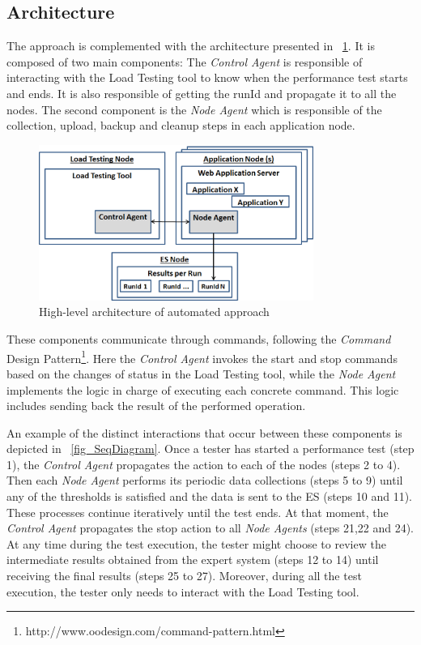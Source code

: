 \documentclass[runningheads,a4paper]{llncs}
\begin{document}
\vspace{-5pt}
\subsection{Architecture}
\vspace{-5pt}
The approach is complemented with the architecture
presented in \figurename ~\ref{fig_Arch}. It is composed of two main components:
The \emph{Control Agent} is responsible of interacting with the Load
Testing tool to know when the performance test starts and ends. It is also
responsible of getting the runId and propagate it to all the nodes. The second
component is the \emph{Node Agent} which is responsible of the collection,
upload, backup and cleanup steps in each application node. 

\begin{figure}[!h]
\centering
\includegraphics[totalheight=.22\textheight,width=0.8\textwidth]{architecture_dwait}
\caption{High-level architecture of automated approach}
\label{fig_Arch}
\end{figure}

These components communicate through commands, following the \emph{Command}
Design Pattern\footnote{http://www.oodesign.com/command-pattern.html}. Here the
\emph{Control Agent} invokes the start and stop commands based on the
changes of status in the Load Testing tool, while the \emph{Node Agent}
implements the logic in charge of executing each concrete command. This logic
includes sending back the result of the performed operation.

An example of the distinct interactions that occur between these
components is depicted in \figurename ~\ref{fig_SeqDiagram}. Once a tester has
started a performance test (step 1), the \emph{Control Agent} propagates the
action to each of the nodes (steps 2 to 4). Then each \emph{Node Agent} performs
its periodic data collections (steps 5 to 9) until any of the thresholds is
satisfied and the data is sent to the ES (steps 10 and 11). These processes
continue iteratively until the test ends. At that moment, the \emph{Control
Agent} propagates the stop action to all \emph{Node Agents} (steps 21,22 and
24). At any time during the test execution, the tester might choose to review
the intermediate results obtained from the expert system (steps 12 to 14) until
receiving the final results (steps 25 to 27). Moreover, during all the test
execution, the tester only needs to interact with the Load Testing tool.
\end{document}
